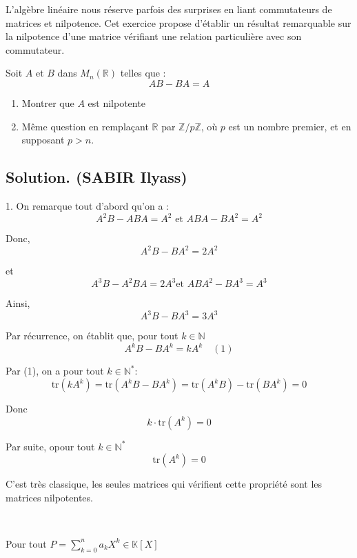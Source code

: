L'alg{\`e}bre lin{\'e}aire nous r{\'e}serve parfois des surprises en liant
commutateurs de matrices et nilpotence. Cet exercice propose d'{\'e}tablir un
r{\'e}sultat remarquable sur la nilpotence d'une matrice v{\'e}rifiant une
relation particuli{\`e}re avec son commutateur.
\begin{exercise}
Soit $A$ et $B$ dans $M_n (\mathbb{R})$ telles que :
\[ AB - BA = A \]
\begin{enumerate}
  \item Montrer que $A$ est nilpotente
  
  \item M{\^e}me question en rempla{\c c}ant $\mathbb{R}$ par $\mathbb{Z}/
  p\mathbb{Z}$, o{\`u} $p$ est un nombre premier, et en supposant $p > n$.
\end{enumerate}
\end{exercise}

\subsection*{Solution. (SABIR Ilyass)}

1. On remarque tout d'abord qu'on a :
\[ A^2 B - ABA = A^2  \text{ et } ABA - BA^2 = A^2 \]


Donc,
\[ A^2 B - BA^2 = 2 A^2 \]


et
\[ A^3 B - A^2 BA = 2 A^3  \text{et } ABA^2 - BA^3 = A^3 \]


Ainsi,
\[ A^3 B - BA^3 = 3 A^3 \]


Par r{\'e}currence, on {\'e}tablit que, pour tout $k \in \mathbb{N}$
\[ A^k B - BA^k = kA^k  \quad (1) \]



Par (1), on a pour tout $k \in \mathbb{N}^{\ast}$:
\[ \text{tr} (kA^k) = \text{tr} (A^k B - BA^k) = \text{tr} (A^k B) - \text{tr}
   (BA^k) = 0 \]


Donc
\[ k \cdot \text{tr} (A^k) = 0 \]


Par suite, opour tout $k \in \mathbb{N}^{\ast}$
\[ \text{tr} (A^k) = 0 \]


C'est tr{\`e}s classique, les seules matrices qui v{\'e}rifient cette
propri{\'e}t{\'e} sont les matrices nilpotentes.

\


Pour tout $P = \sum^n_{k = 0} a_k X^k \in \mathbb{K}[X]$

